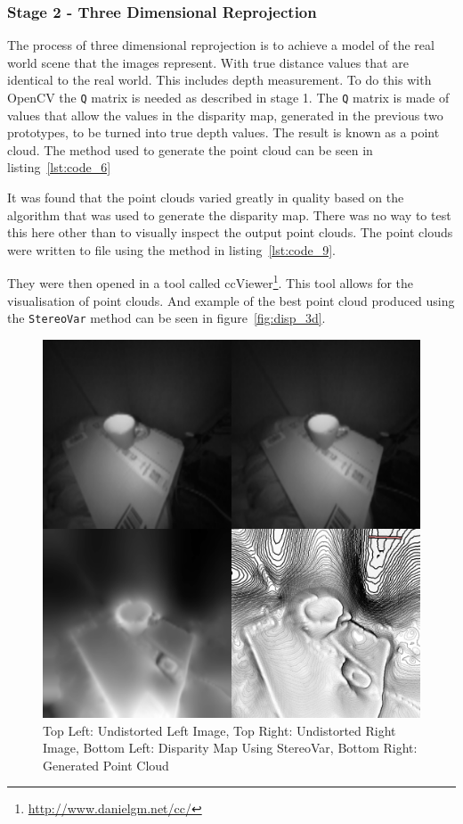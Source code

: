 \documentclass[11pt,oneside]{report}
\newcommand\code[1]{\texttt{#1}}
\begin{document}
		\subsubsection{Stage 2 - Three Dimensional Reprojection}
			The process of three dimensional reprojection is to achieve a model of the real world scene that the images represent. 
			With true distance values that are identical to the real world.
			This includes depth measurement.
			To do this with OpenCV the \code{Q} matrix is needed as described in stage 1.
			The \code{Q} matrix is made of values that allow the values in the disparity map, generated in the previous two prototypes, to be turned into true depth values.
			The result is known as a point cloud.
			The method used to generate the point cloud can be seen in listing~\ref{lst:code_6}
				
			It was found that the point clouds varied greatly in quality based on the algorithm that was used to generate the disparity map.
			There was no way to test this here other than to visually inspect the output point clouds.
			The point clouds were written to file using the method in listing~\ref{lst:code_9}.
			
			They were then opened in a tool called ccViewer\footnote{\url{http://www.danielgm.net/cc/}}.
			This tool allows for the visualisation of point clouds.
			And example of the best point cloud produced using the \code{StereoVar} method can be seen in figure~\ref{fig:disp_3d}.
			\begin{figure}
			\centering
    				\includegraphics[width=\textwidth]{disp_3d}
    			\caption{Top Left: Undistorted Left Image, Top Right: Undistorted Right Image, Bottom Left: Disparity Map Using StereoVar, Bottom Right: Generated Point Cloud \protect {\label{fig:disp_3d}}}

			\end{figure}	
\end{document}
